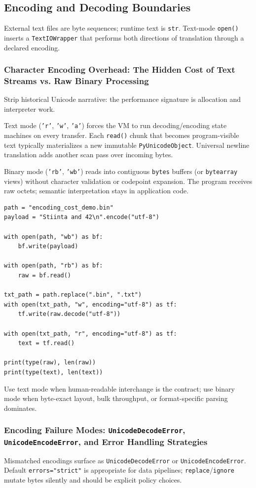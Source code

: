 \subsection{Encoding and Decoding Boundaries}

External text files are byte sequences; runtime text is \texttt{str}. Text-mode \texttt{open()} inserts a \texttt{TextIOWrapper} that performs both directions of translation through a declared encoding.

\subsubsection{Character Encoding Overhead: The Hidden Cost of Text Streams vs. Raw Binary Processing}

Strip historical Unicode narrative: the performance signature is allocation and interpreter work.

Text mode (\texttt{'r'}, \texttt{'w'}, \texttt{'a'}) forces the VM to run decoding/encoding state machines on every transfer. Each \texttt{read()} chunk that becomes program-visible text typically materializes a new immutable \texttt{PyUnicodeObject}. Universal newline translation adds another scan pass over incoming bytes.

Binary mode (\texttt{'rb'}, \texttt{'wb'}) reads into contiguous \texttt{bytes} buffers (or \texttt{bytearray} views) without character validation or codepoint expansion. The program receives raw octets; semantic interpretation stays in application code.

\begin{verbatim}
path = "encoding_cost_demo.bin"
payload = "Stiinta and 42\n".encode("utf-8")

with open(path, "wb") as bf:
    bf.write(payload)

with open(path, "rb") as bf:
    raw = bf.read()

txt_path = path.replace(".bin", ".txt")
with open(txt_path, "w", encoding="utf-8") as tf:
    tf.write(raw.decode("utf-8"))

with open(txt_path, "r", encoding="utf-8") as tf:
    text = tf.read()

print(type(raw), len(raw))
print(type(text), len(text))
\end{verbatim}

Use text mode when human-readable interchange is the contract; use binary mode when byte-exact layout, bulk throughput, or format-specific parsing dominates.

\subsubsection{Encoding Failure Modes: \texttt{UnicodeDecodeError}, \texttt{UnicodeEncodeError}, and Error Handling Strategies}

Mismatched encodings surface as \texttt{UnicodeDecodeError} or \texttt{UnicodeEncodeError}. Default \texttt{errors="strict"} is appropriate for data pipelines; \texttt{replace}/\texttt{ignore} mutate bytes silently and should be explicit policy choices.

